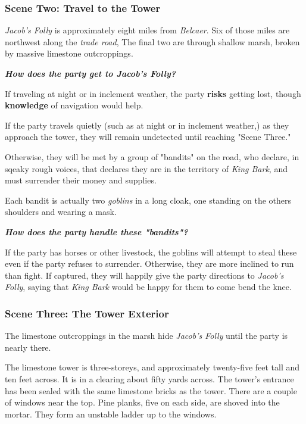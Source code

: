 \documentclass[11pt]{teraum_adventure}
\begin{document}
\subsubsection*{Scene Two: Travel to the Tower}
\label{sec:orge07939b}
\emph{Jacob's Folly} is approximately eight miles from \emph{Belcaer}. Six of
those miles are northwest along the \emph{trade road}, The final two
are through shallow marsh, broken by massive limestone outcroppings.

\textbf{\emph{How does the party get to Jacob's Folly?}}

If traveling at night or in inclement weather, the party \textbf{risks}
getting lost, though \textbf{knowledge} of navigation would help.

If the party travels quietly (such as at night or in inclement
weather,) as they approach the tower, they will remain undetected
until reaching "Scene Three."

Otherwise, they will be met by a group of "bandits" on the road, who
declare, in sqeaky rough voices, that declares they are in the
territory of \emph{King Bark}, and must surrender their money and supplies.

Each bandit is actually two \emph{goblins} in a long cloak, one standing on
the others shoulders and wearing a mask.

\textbf{\emph{How does the party handle these "bandits"?}}

If the party has horses or other livestock, the goblins will attempt
to steal these even if the party refuses to surrender. Otherwise, they
are more inclined to run than fight. If captured, they will happily
give the party directions to \emph{Jacob's Folly}, saying that \emph{King Bark}
would be happy for them to come bend the knee.
\subsubsection*{Scene Three: The Tower Exterior}
\label{sec:org899897e}
The limestone outcroppings in the marsh hide \emph{Jacob's Folly} until the
party is nearly there.

The limestone tower is three-storeys, and approximately twenty-five
feet tall and ten feet across. It is in a clearing about fifty yards
across. The tower's entrance has been sealed with the same limestone
bricks as the tower. There are a couple of windows near the top. Pine
planks, five on each side, are shoved into the mortar. They form an
unstable ladder up to the windows.
\end{document}
